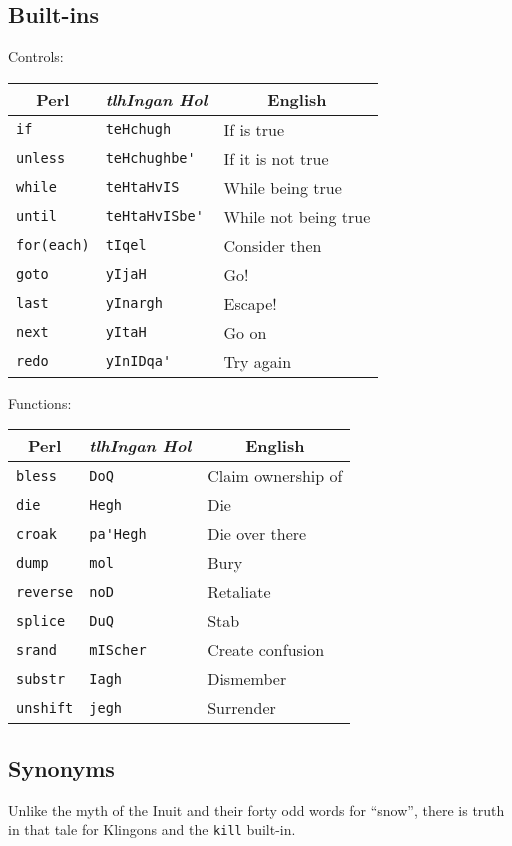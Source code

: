 \documentclass{article}
\begin{document}
\subsection{Built-ins}
Controls:
\begin{center}
\begin{tabular}{l|l|l}
\multicolumn{1}{c|}{Perl} & \multicolumn{1}{c|}{\it tlhIngan Hol}
& \multicolumn{1}{c}{English}\\\hline
\verb"if" & \verb"teHchugh" & If is true\\
\verb"unless" & \verb"teHchughbe'" & If it is not true\\
\verb"while" & \verb"teHtaHvIS" & While being true\\
\verb"until" & \verb"teHtaHvISbe'" & While not being true\\
\verb"for(each)" & \verb"tIqel" & Consider then\\
\verb"goto" & \verb"yIjaH" & Go!\\
\verb"last" & \verb"yInargh" & Escape!\\
\verb"next" & \verb"yItaH" & Go on\\
\verb"redo" & \verb"yInIDqa'" & Try again\\
\end{tabular}
\end{center}

\noindent Functions:
\begin{center}
\begin{tabular}{l|l|l}
\multicolumn{1}{c|}{Perl} & \multicolumn{1}{c|}{\it tlhIngan Hol}
& \multicolumn{1}{c}{English}\\\hline
\verb"bless" & \verb"DoQ" & Claim ownership of\\
\verb"die" & \verb"Hegh" & Die\\
\verb"croak" & \verb"pa'Hegh" & Die over there\\
\verb"dump" & \verb"mol" & Bury\\
\verb"reverse" & \verb"noD" & Retaliate\\
\verb"splice" & \verb"DuQ" & Stab\\
\verb"srand" & \verb"mIScher" & Create confusion\\
\verb"substr" & \verb"Iagh" & Dismember\\
\verb"unshift" & \verb"jegh" & Surrender\\
\end{tabular}
\end{center}

\subsection{Synonyms}
Unlike the myth of the Inuit and their forty odd words for ``snow'',
there is truth in that tale for Klingons and the \verb'kill' built-in.
\end{document}
